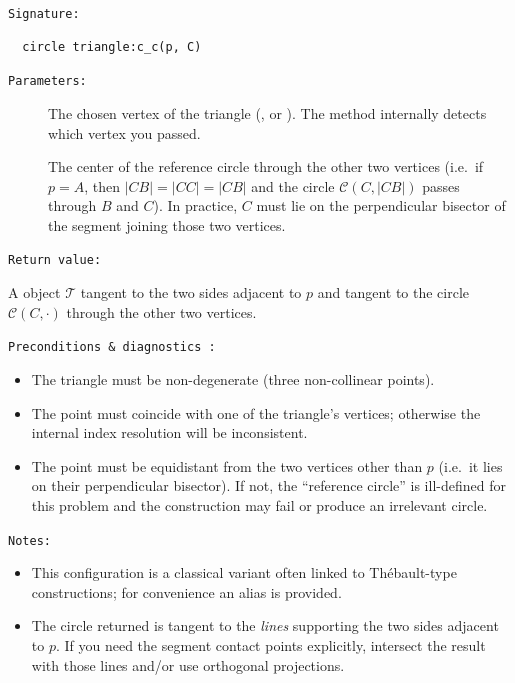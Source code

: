 \texttt{Signature: }

\begin{verbatim}
  circle triangle:c_c(p, C)
\end{verbatim}

\texttt{Parameters: }

\begin{description}
  \item[] The chosen vertex of the triangle (,  or ). The method internally detects which vertex you passed.
  \item[] The center of the reference circle through the other two vertices (i.e.\ if \(p=A\), then \(|CB|=|CC|=|C\!B|\) and the circle \(\mathcal{C}(C,|CB|)\) passes through \(B\) and \(C\)). In practice, \(C\) must lie on the perpendicular bisector of the segment joining those two vertices.
\end{description}

\texttt{Return value: }

A  object $\mathcal{T}$ tangent to the two sides adjacent to \(p\) and tangent to the circle $\mathcal{C}(C,\cdot)$ through the other two vertices.


\texttt{Preconditions \& diagnostics :}

\begin{itemize}
  \item The triangle must be non-degenerate (three non-collinear points).
  \item The point  must coincide with one of the triangle’s vertices; otherwise the internal index resolution will be inconsistent.
  \item The point  must be equidistant from the two vertices other than \(p\) (i.e.\ it lies on their perpendicular bisector). If not, the “reference circle” is ill-defined for this problem and the construction may fail or produce an irrelevant circle.
\end{itemize}

\texttt{Notes: }

\begin{itemize}
  \item This configuration is a classical variant often linked to Thébault-type constructions; for convenience an alias  is provided.
  \item The circle returned is tangent to the \emph{lines} supporting the two sides adjacent to \(p\). If you need the segment contact points explicitly, intersect the result with those lines and/or use orthogonal projections.
\end{itemize}

